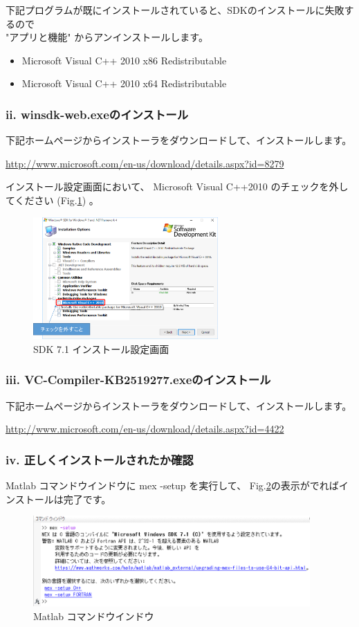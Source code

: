 下記プログラムが既にインストールされていると、SDKのインストールに失敗するので\\
"アプリと機能" からアンインストールします。

\begin{itemize}
  \tightlist
  \item
  Microsoft Visual C++ 2010 x86 Redistributable
  \item
  Microsoft Visual C++ 2010 x64 Redistributable
  \end{itemize}


\clearpage
\subsubsection{ii. winsdk-web.exeのインストール}\label{sec:section1.4.1-2}

下記ホームページからインストーラをダウンロードして、インストールします。

\url{http://www.microsoft.com/en-us/download/details.aspx?id=8279}

インストール設定画面において、
Microsoft Visual C++2010 のチェックを外してください (Fig.\ref{fig106}) 。

\begin{figure}[htbp]
  \centering
  \includegraphics[width=200pt]{fig/fig106.eps}
  \caption{SDK 7.1 インストール設定画面}
  \label{fig106}
  \end{figure}


\subsubsection{iii. VC-Compiler-KB2519277.exeのインストール}\label{sec:section1.4.1-3}

下記ホームページからインストーラをダウンロードして、インストールします。

\url{http://www.microsoft.com/en-us/download/details.aspx?id=4422}

\subsubsection{iv. 正しくインストールされたか確認}\label{sec:section1.4.1-4}

Matlab コマンドウインドウに mex -setup を実行して、
Fig.\ref{fig107}の表示がでればインストールは完了です。

\begin{figure}[htbp]
  \centering
  \includegraphics[width=300pt]{fig/fig107.eps}
  \caption{Matlab コマンドウインドウ}
  \label{fig107}
  \end{figure}